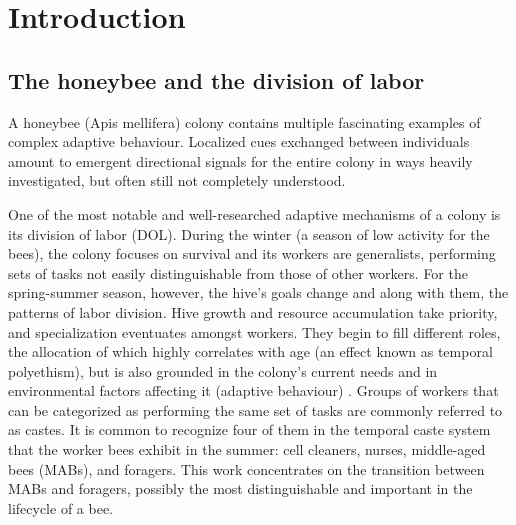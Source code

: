 
\chapter{Introduction}  %

\ifpdf
    \graphicspath{{Chapters/Chapter1/Figs/Raster/}{Chapters/Chapter1/Figs/PDF/}{Chapters/Chapter1/Figs/}}
\else
    \graphicspath{{Chapters/Chapter1/Figs/Vector/}{Chapters/Chapter1/Figs/}}
\fi


\section{The honeybee and the division of labor} %
A honeybee (Apis mellifera) colony contains multiple fascinating examples of complex adaptive behaviour. 
Localized cues exchanged between individuals amount to emergent directional signals for the entire colony 
in ways heavily investigated, but often still not completely understood. 

One of the most notable and well-researched adaptive mechanisms of a colony is its division of labor (DOL). 
During the winter (a season of low activity for the bees), the colony focuses on survival 
and its workers are generalists, performing sets of tasks not easily distinguishable from those of other workers. 
For the spring-summer season, however, the hive’s goals change and along with them, the patterns of labor division. 
Hive growth and resource accumulation take priority, and specialization eventuates amongst workers. 
They begin to fill different roles, the allocation of which highly correlates with age (an effect 
known as temporal polyethism), but is also grounded in the colony’s current needs and in environmental 
factors affecting it (adaptive behaviour) \citep{seeley_adaptive_1982}. Groups of workers that can be 
categorized as performing the same set of tasks are commonly referred to as castes. It is common to recognize 
four of them in the temporal caste system that the worker bees exhibit in the summer: 
cell cleaners, nurses, middle-aged bees (MABs), and foragers. 
This work concentrates on the transition between MABs and foragers, 
possibly the most distinguishable and important in the lifecycle of a bee.


